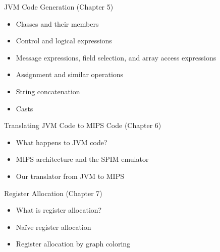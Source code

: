 \documentclass[8pt,a4paper,compress]{beamer}
\begin{document}
\begin{frame}[fragile]
\pause

JVM Code Generation (Chapter 5)
\begin{itemize}
\item Classes and their members
\item Control and logical expressions
\item Message expressions, field selection, and array access expressions
\item Assignment and similar operations
\item String concatenation
\item Casts
\end{itemize}

\pause
\bigskip

Translating JVM Code to MIPS Code (Chapter 6)
\begin{itemize}
\item What happens to JVM code?
\item MIPS architecture and the SPIM emulator
\item Our translator from JVM to MIPS
\end{itemize}

\pause
\bigskip

Register Allocation (Chapter 7)
\begin{itemize}
\item What is register allocation?
\item Na\"{i}ve register allocation
\item Register allocation by graph coloring
\end{itemize}
\end{frame}
\end{document}
